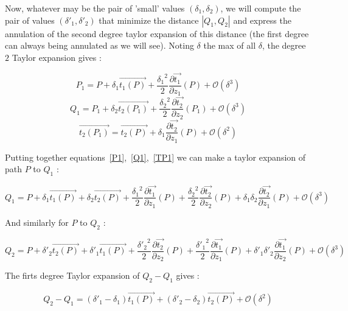 \documentclass[a4paper]{article}
\newcommand{\BigV}[1]{\ensuremath{\overrightarrow{#1}}}
\newcommand{\TanO}[1]{\BigV{t_1#1}}
\newcommand{\TanT}[1]{\BigV{t_2#1}}
\newcommand{\Negl}[1]{\ensuremath{\mathcal{O}(#1)}}
\newcommand{\DerPart}[2]{\frac{\partial #1}{\partial #2}}
\begin{document}
Now, whatever may be the pair of 'small' values $(\delta_1,\delta_2)$,  we will compute the  pair of values
$(\delta'_1,\delta'_2)$ that minimize the distance $|Q_1,Q_2|$ and express the annulation of the
second degree taylor expansion of this distance (the first degree can always being annulated as we will see). 
Noting $\delta$ the max of all $\delta$, the degree $2$ Taylor expansion gives :

\begin{equation}
    P_1 =  P +  \delta_1 \TanO{(P)} + \frac{{\delta_1}^2}{2} \DerPart { \TanO{}}{z_1}(P)  + \Negl{\delta^3} \label{P1} 
\end{equation}
\begin{equation}
    Q_1 =  P_1 +  \delta_2 \TanT{(P_1)} + \frac{{\delta_2}^2}{2} \DerPart { \TanT{}}{z_2}(P_1) + \Negl{\delta^3} \label{Q1}
\end{equation}
\begin{equation}
     \TanT{(P_1)} = \TanT{(P)} +  \delta_1   \DerPart { \TanT{}}{z_1}(P) + \Negl{\delta^2} \label{TP1}
\end{equation}

Putting together equations~\ref{P1},~\ref{Q1},~\ref{TP1} we can make a taylor expansion of path
$P$ to $Q_1$ :

\begin{equation}
    Q_1 =    P +  \delta_1 \TanO{(P)} 
               +  \delta_2 \TanT{(P)} 
               + \frac{{\delta_1}^2}{2} \DerPart { \TanO{}}{z_1}(P) 
               + \frac{{\delta_2}^2}{2} \DerPart { \TanT{}}{z_2}(P) 
               +  \delta_1  \delta_2  \DerPart { \TanT{}}{z_1}(P)  
               + \Negl{\delta^3}
       \label{Q1ofP}
\end{equation}

And similarly for $P$ to $Q_2$ :

\begin{equation}
    Q_2 =    P +  \delta'_2 \TanT{(P)} 
               +  \delta'_1 \TanO{(P)} 
               + \frac{{\delta'_2}^2}{2} \DerPart { \TanT{}}{z_2}(P) 
               + \frac{{\delta'_1}^2}{2} \DerPart { \TanO{}}{z_1}(P) 
               +  \delta'_1  \delta'_2  \DerPart { \TanO{}}{z_2}(P)  
               + \Negl{\delta^3}
       \label{Q2ofP}
\end{equation}

The firts degree Taylor expansion of $Q_2-Q_1$ gives :

\begin{equation}
    Q_2 -Q_1 =   (\delta'_1 -\delta_1) \TanO{(P)} +  (\delta'_2 -\delta_2) \TanT{(P)}  + \Negl{\delta^2}
\end{equation}
\end{document}
